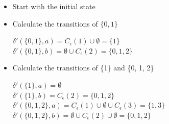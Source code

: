 \documentclass[11pt]{article}
\begin{document}
\begin{itemize}
\item{Start with the initial state}
\begin{figure}[h]
\centering
{}
\end{figure}


\item{Calculate the transitions of $\{0, 1\}$}

$\delta'(\{0, 1\}, a) = C_{\epsilon}(1) \cup \emptyset = \{1\}$\\
$\delta'(\{0, 1\}, b) = \emptyset \cup C_{\epsilon}(2) = \{0, 1, 2\}$\\

\begin{figure}[h]
\centering
{}
\end{figure}


\item{Calculate the transitions of \{1\} and \{0, 1, 2\}}

$\delta'(\{1\}, a) = \emptyset$\\
$\delta'(\{1\}, b) = C_{\epsilon}(2) = \{0, 1, 2\}$\\
$\delta'(\{0, 1, 2\}, a) = C_{\epsilon}(1) \cup \emptyset \cup C_{\epsilon}(3)= \{1, 3\}$\\
$\delta'(\{0, 1, 2\}, b) = \emptyset \cup C_{\epsilon}(2) \cup \emptyset = \{0, 1, 2\}$\\

\begin{figure}[ht!]
\centering
{}
\end{figure}


\end{itemize}
\end{document}
